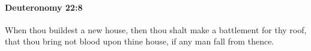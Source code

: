 
		\paragraph{Deuteronomy 22:8} %
			\label{DEUTERONOMY-22-8}

			When thou buildest a new house, then thou shalt make a battlement for thy roof, that thou bring not blood upon thine house, if any man fall from thence.


